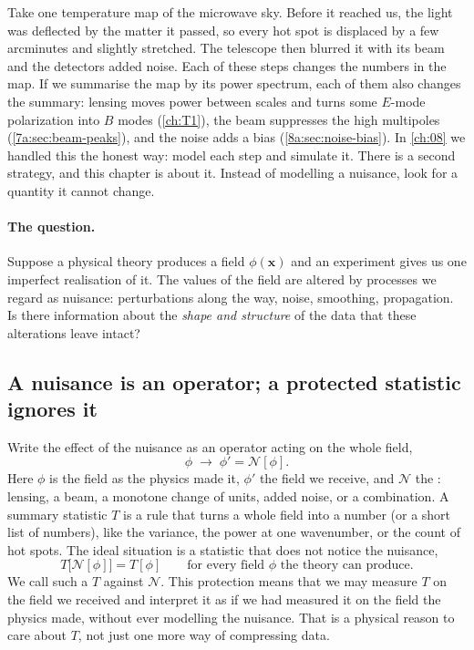 Take one temperature map of the microwave sky. Before it reached us, the light was deflected by the
matter it passed, so every hot spot is displaced by a few arcminutes and slightly stretched. The telescope
then blurred it with its beam and the detectors added noise. Each of these steps changes the numbers in the
map. If we summarise the map by its power spectrum, each of them also changes the summary: lensing moves
power between scales and turns some $E$-mode polarization into $B$ modes (\cref{ch:T1}), the beam suppresses
the high multipoles (\cref{7a:sec:beam-peaks}), and the noise adds a bias (\cref{8a:sec:noise-bias}). In
\cref{ch:08} we handled this the honest way: model each step and simulate it. There is a second strategy,
and this chapter is about it. Instead of modelling a nuisance, look for a quantity it cannot change.

\paragraph{The question.} Suppose a physical theory produces a field $\phi(\bm x)$ and an experiment gives
us one imperfect realisation of it. The values of the field are altered by processes we regard as nuisance:
perturbations along the way, noise, smoothing, propagation. Is there information about the \emph{shape and
structure} of the data that these alterations leave intact?

\subsection{A nuisance is an operator; a protected statistic ignores it}
\label{12a:sec:operator}

Write the effect of the nuisance as an operator acting on the whole field,
\begin{equation}
  \phi\;\longrightarrow\;\phi'=\mathcal N[\phi] .
  \label{12a:eq:nuisance}
\end{equation}
Here $\phi$ is the field as the physics made it, $\phi'$ the field we receive, and $\mathcal N$ the
: lensing, a beam, a monotone change of units, added noise, or a combination.
A summary statistic $T$ is a rule that turns a whole field into a number (or a short list of numbers), like
the variance, the power at one wavenumber, or the count of hot spots. The ideal situation is a statistic
that does not notice the nuisance,
\begin{equation}
  T\big[\mathcal N[\phi]\big]=T[\phi]\qquad\text{for every field }\phi\text{ the theory can produce.}
  \label{12a:eq:protected}
\end{equation}
We call such a $T$  against $\mathcal N$. This protection means that we may measure $T$ on the field
we received and interpret it as if we had measured it on the field the physics made, without ever
modelling the nuisance. That is a physical reason to care about $T$, not just one more way of
compressing data.

